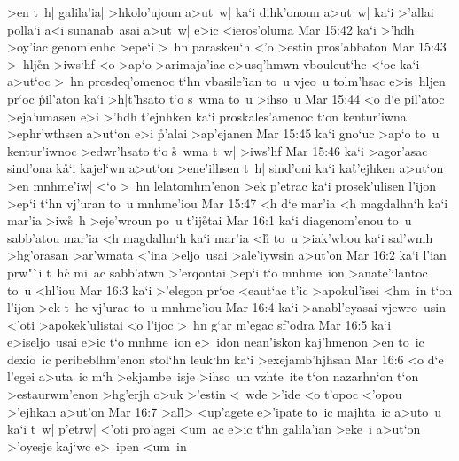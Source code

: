 >en
t~h|
galila'ia|
>hkolo'ujoun
a>ut~w|
ka`i
dihk'onoun
a>ut~w|
ka`i
>'allai
polla`i
a<i
sunanab~asai
a>ut~w|
e>ic
<ieros'oluma\bibvsend
\vs Mar 15:42
ka`i
>'hdh
>oy'iac
genom'enhc
>epe`i
>~hn
paraskeu`h
<'o
>estin
pros'abbaton\bibvsend
\vs Mar 15:43
>~hlj\r{e}n
>iws`hf
<o
>ap`o
>arimaja'iac
e>usq'hmwn
vbouleut`hc
<`oc
ka`i
a>ut`oc
>~hn
prosdeq'omenoc
t`hn
vbasile'ian
to~u
vjeo~u
tolm'hsac
e>is~hljen
pr`oc
\r{p}il'aton
ka`i
>h|t'hsato
t`o
s~wma
to~u
>ihso~u\bibvsend
\vs Mar 15:44
<o
d`e
pil'atoc
>eja'umasen
e>i
>'hdh
t'ejnhken
ka`i
proskales'amenoc
t`on
kentur'iwna
>ephr'wthsen
a>ut`on
e>i
\r{p}'alai
>ap'ejanen\bibvsend
\vs Mar 15:45
ka`i
gno`uc
>ap`o
to~u
kentur'iwnoc
>edwr'hsato
t`o
\r{s}~wma
t~w|
>iws'hf\bibvsend
\vs Mar 15:46
ka`i
>agor'asac
sind'ona
k\r{a}`i
kajel`wn
a>ut`on
>ene'ilhsen
t~h|
sind'oni
ka`i
ka\r{t}'ejhken
a>ut`on
>en
mnhme'iw|
<`o
>~hn
lelatomhm'enon
>ek
p'etrac
ka`i
prosek'ulisen
l'ijon
>ep`i
t`hn
vj'uran
to~u
mnhme'iou\bibvsend
\vs Mar 15:47
<h
d`e
mar'ia
<h
magdalhn`h
ka`i
mar'ia
>iw\r{s}~h
>eje'wroun
po~u
t'ij\r{e}tai\bibvsend
{}
\vs Mar 16:1
ka`i
diagenom'enou
to~u
sabb'atou
mar'ia
<h
magdalhn`h
ka`i
mar'ia
<h\r{}
to~u
>iak'wbou
ka`i
sal'wmh
>hg'orasan
>ar'wmata
<'ina
>eljo~usai
>ale'iywsin
a>ut'on\bibvsend
\vs Mar 16:2
ka`i
l'ian
prw"`i
t~hc\r{}
mi~ac
sabb'atwn
>'erqontai
>ep`i
t`o
mnhme~ion
>anate'ilantoc
to~u
<hl'iou\bibvsend
\vs Mar 16:3
ka`i
>'elegon
pr`oc
<eaut`ac
t'ic
>apokul'isei
<hm~in
t`on
l'ijon
>ek
t~hc
vj'urac
to~u
mnhme'iou\bibvsend
\vs Mar 16:4
ka`i
>anabl'eyasai
vjewro~usin
<'oti
>apokek'ulistai
<o
l'ijoc
>~hn
g`ar
m'egac
sf'odra\bibvsend
\vs Mar 16:5
ka`i
e>iseljo~usai
e>ic
t`o
mnhme~ion
e>~idon
nean'iskon
kaj'hmenon
>en
to~ic
dexio~ic
peribeblhm'enon
stol`hn
leuk`hn
ka`i
>exejamb'hjhsan\bibvsend
\vs Mar 16:6
<o
d`e
l'egei
a>uta~ic
m`h
>ekjambe~isje
>ihso~un
vzhte~ite
t`on
nazarhn`on
t`on
>estaurwm'enon
>hg'erjh
o>uk
>'estin
<~wde
>'ide
<o
t'opoc
<'opou
>'ejhkan
a>ut'on\bibvsend
\vs Mar 16:7
>al\r{l}>
<up'agete
e>'ipate
to~ic
majhta~ic
a>uto~u
ka`i
t~w|
p'etrw|
<'oti
pro'agei
<um~ac
e>ic
t`hn
galila'ian
>eke~i
a>ut`on
>'oyesje
kaj`wc
e>~ipen
<um~in\bibvsend
